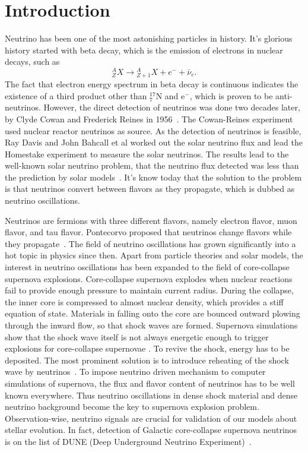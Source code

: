 \chapter{Introduction}
\label{introduction}

Neutrino has been one of the most astonishing particles in history. It's glorious history started with beta decay, which is the emission of electrons in nuclear decays, such as
\begin{equation*}
{}^A_Z X \to {}_{Z+1}^AX + e^- +\bar \nu_e .
\end{equation*}
The fact that electron energy spectrum in beta decay is continuous indicates the existence of a third product other than ${}^{17}_{7}\mathrm N$ and $\mathrm e^-$, which is proven to be anti-neutrinos. However, the direct detection of neutrinos was done two decades later, by Clyde Cowan and Frederick Reines in 1956~\cite{Cowan1956}. The Cowan-Reines experiment used nuclear reactor neutrinos as source. As the detection of neutrinos is feasible, Ray Davis and John Bahcall et al worked out the solar neutrino flux and lead the Homestake experiment to measure the solar neutrinos. The results lead to the well-known solar neutrino problem, that the neutrino flux detected was less than the prediction by solar models~\cite{Bahcall1973}. It's know today that the solution to the problem is that neutrinos convert between flavors as they propagate, which is dubbed as neutrino oscillations. 

Neutrinos are fermions with three different flavors, namely electron flavor, muon flavor, and tau flavor. Pontecorvo proposed that neutrinos change flavors while they propagate~\cite{Pontecorvo1968}. The field of neutrino oscillations has grown significantly into a hot topic in physics since then. Apart from particle theories and solar models, the interest in neutrino oscillations has been expanded to the field of core-collapse supernova explosions. Core-collapse supernova explodes when nuclear reactions fail to provide enough pressure to maintain current radius. During the collapse, the inner core is compressed to almost nuclear density, which provides a stiff equation of state. Materials in falling onto the core are bounced outward plowing through the inward flow, so that shock waves are formed. Supernova simulations show that the shock wave itself is not always energetic enough to trigger explosions for core-collapse supernovae \cite{Janka2016b}. To revive the shock, energy has to be deposited. The most prominent solution is to introduce reheating of the shock wave by neutrinos~\cite{Janka2016b}. To impose neutrino driven mechanism to computer simulations of supernova, the flux and flavor content of neutrinos has to be well known everywhere. Thus neutrino oscillations in dense shock material and dense neutrino background become the key to supernova explosion problem. Observation-wise, neutrino signals are crucial for validation of our models about stellar evolution. In fact, detection of Galactic core-collapse supernova neutrinos is on the list of DUNE (Deep Underground Neutrino Experiment)~\cite{Kemp2017}.

